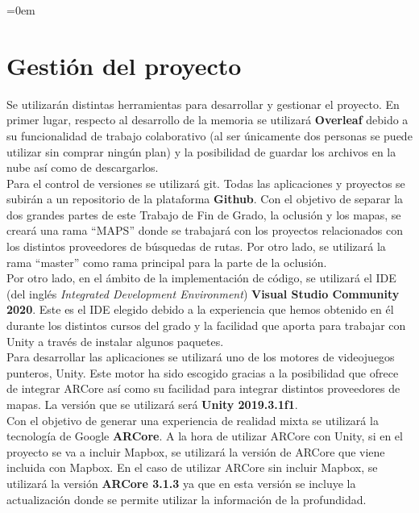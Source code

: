 \parindent=0em
\section{Gestión del proyecto}
\noindent

Se utilizarán distintas herramientas para desarrollar y gestionar el proyecto. En primer lugar, respecto al desarrollo de la memoria se utilizará \textbf{Overleaf} debido a su funcionalidad de trabajo colaborativo (al ser únicamente dos personas se puede utilizar sin comprar ningún plan) y la posibilidad de guardar los archivos en la nube así como de descargarlos.\\

Para el control de versiones se utilizará git. Todas las aplicaciones y proyectos se subirán a un repositorio de la plataforma \textbf{Github}. Con el objetivo de separar la dos grandes partes de este Trabajo de Fin de Grado, la oclusión y los mapas, se creará una rama ``MAPS'' donde se trabajará con los proyectos relacionados con los distintos proveedores de búsquedas de rutas. Por otro lado, se utilizará la rama ``master'' como rama principal para la parte de la oclusión.\\

Por otro lado, en el ámbito de la implementación de código, se utilizará el IDE (del inglés \textit{Integrated Development Environment}) \textbf{Visual Studio Community 2020}. Este es el IDE elegido debido a la experiencia que hemos obtenido en él durante los distintos cursos del grado y la facilidad que aporta para trabajar con Unity a través de instalar algunos paquetes.\\

Para desarrollar las aplicaciones se utilizará uno de los motores de videojuegos punteros, Unity. Este motor ha sido escogido gracias a la posibilidad que ofrece de integrar ARCore así como su facilidad para integrar distintos proveedores de mapas. La versión que se utilizará será \textbf{Unity 2019.3.1f1}. \\

Con el objetivo de generar una experiencia de realidad mixta se utilizará la tecnología de Google \textbf{ARCore}. A la hora de utilizar ARCore con Unity, si en el proyecto se va a incluir Mapbox, se utilizará la versión de ARCore que viene incluida con Mapbox. En el caso de utilizar ARCore sin incluir Mapbox, se utilizará la versión \textbf{ARCore 3.1.3} ya que en esta versión se incluye la actualización donde se permite utilizar la información de la profundidad.
